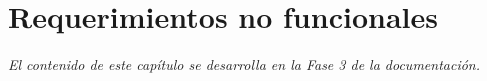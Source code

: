 \chapter{Requerimientos no funcionales}\label{cap:rnf}

\textit{El contenido de este capítulo se desarrolla en la Fase 3 de la documentación.}
